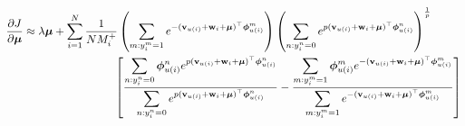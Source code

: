 \begin{equation*}
\begin{aligned}
%
\frac{\partial J}{\partial \mubm}
&\approx \lambda \mubm
  + \sum_{i=1}^N \frac{1}{N M_i^+} 
    \left( \sum_{m: y_i^m = 1} e^{-(\bv_{u(i)} + \w_i + \mubm)^\top \phibm_{u(i)}^m} \right)
    \left( \sum_{n: y_i^n = 0} e^{p (\bv_{u(i)} + \w_i + \mubm)^\top \phibm_{u(i)}^n} \right)^\frac{1}{p} \\
& \hspace{8em} \left[ 
    \frac{ \displaystyle \sum_{n: y_i^n = 0} \phibm_{u(i)}^n e^{p (\bv_{u(i)} + \w_i + \mubm)^\top \phibm_{u(i)}^n} }
         { \displaystyle \sum_{n: y_i^n = 0} e^{p (\bv_{u(i)} + \w_i + \mubm)^\top \phibm_{u(i)}^n} }
    - \frac{ \displaystyle \sum_{m: y_i^m = 1} \phibm_{u(i)}^m e^{-(\bv_{u(i)} + \w_i + \mubm)^\top \phibm_{u(i)}^m} }
           { \displaystyle \sum_{m: y_i^m = 1} e^{-(\bv_{u(i)} + \w_i + \mubm)^\top \phibm_{u(i)}^m} } \right]
\end{aligned}
\end{equation*}
